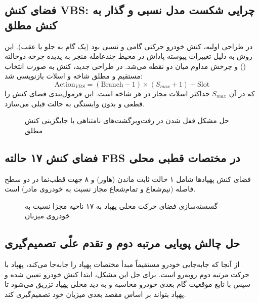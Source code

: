 \documentclass[a4paper,12pt,oneside]{report}
\begin{document}
\subsection{فضای کنش VBS: چرایی شکست مدل نسبی و گذار به کنش مطلق}
در طراحی اولیه، کنش خودرو حرکتی گامی و نسبی بود (یک گام به جلو یا عقب). این روش به دلیل تغییرات پیوسته پاداش در محیط چندعامله منجر به پدیده چرخه دوحالته () و چرخش مداوم میان دو نقطه می‌شد. در طراحی جدید، کنش به صورت انتخاب مستقیم و مطلق شاخه و اسلات بازنویسی شد:
\begin{equation}
\text{Action}_{VBS} = (\text{Branch} - 1) \times (S_{max} + 1) + \text{Slot}
\end{equation}
که در آن $S_{max}$ حداکثر اسلات مجاز در هر شاخه است. این فرمول‌بندی فضای کنش را قطعی و بدون وابستگی به حالت قبلی می‌سازد.

\begin{figure}[H]
    \centering
    \caption{حل مشکل قفل شدن در رفت‌وبرگشت‌های نامتناهی با جایگزینی کنش مطلق}
    \label{fig:vbs_circulation_fix}
\end{figure}

\subsection{فضای کنش ۱۷ حالته FBS در مختصات قطبی محلی}
فضای کنش پهپادها شامل ۱ حالت ثابت ماندن (هاور) و ۸ جهت قطب‌نما در دو سطح فاصله (نیم‌شعاع و تمام‌شعاع مجاز نسبت به خودروی مادر) است.

\begin{figure}[H]
    \centering
    \caption{گسسته‌سازی فضای حرکت محلی پهپاد به ۱۷ ناحیه مجزا نسبت به خودروی میزبان}
    \label{fig:fbs_polar_actions}
\end{figure}

\subsection{حل چالش پویایی مرتبه دوم و تقدم علّی تصمیم‌گیری}
از آنجا که جابه‌جایی خودرو مستقیماً مبدأ مختصات پهپاد را جابه‌جا می‌کند، پهپاد با حرکت مرتبه دوم روبه‌رو است. برای حل این مشکل، ابتدا کنش خودرو تعیین شده و سپس با تابع  موقعیت گام بعدی خودرو محاسبه و به دید محلی پهپاد تزریق می‌شود تا پهپاد بتواند بر اساس مقصد بعدی میزبان خود تصمیم‌گیری کند.
\end{document}
